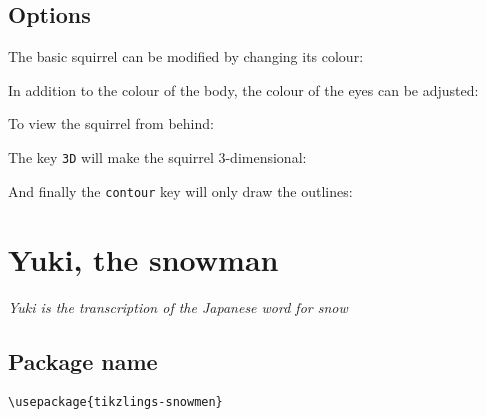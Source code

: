 \documentclass[parskip=half]{scrartcl}
\begin{document}
\begin{tcblisting}{}
\squirrel
\end{tcblisting}

\subsection{Options}

The basic squirrel can be modified by changing its colour:
\begin{tcblisting}{}
\squirrel[body=blue]
\end{tcblisting}

In addition to the colour of the body, the colour of the eyes can be adjusted:
\begin{tcblisting}{}
\squirrel[eye=red]
\end{tcblisting}
\begin{tcblisting}{}
\squirrel[pupil=red]
\end{tcblisting}

To view the squirrel from behind:
\begin{tcblisting}{}
\squirrel[back]
\end{tcblisting}

The key \lstinline|3D| will make the squirrel 3-dimensional:
\begin{tcblisting}{}
\squirrel[3D]
\end{tcblisting}

And finally the \lstinline|contour| key will only draw the outlines:
\begin{tcblisting}{}
\squirrel[contour=black]
\end{tcblisting}

%
%
\clearpage
\section[Snowman]{Yuki, the snowman}

\emph{Yuki is the transcription of the Japanese word for snow}

\subsection{Package name}

\begin{tcolorbox}[lower separated=false, lefthand width=.8\linewidth]
\vspace*{0.5cm}
\lstinline|\usepackage{tikzlings-snowmen}| 
\vspace*{0.5cm}
\end{tcolorbox}
\end{document}
